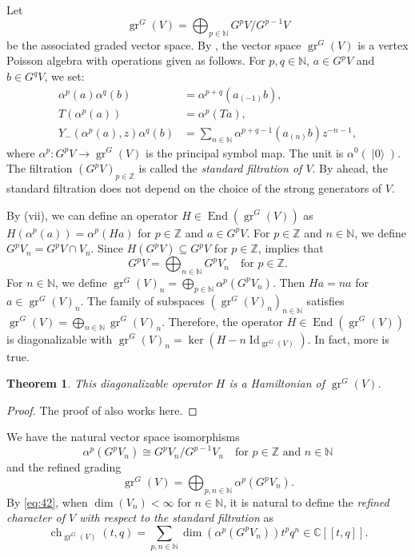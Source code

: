 \documentclass[a4paper, 12pt, reqno]{amsart}
\newtheorem{theorem}{Theorem}[section]
\theoremstyle{remark}
\DeclareMathOperator{\Id}{Id}
\DeclareMathOperator{\gr}{gr}
\DeclareMathOperator{\End}{End}
\DeclareMathOperator{\ch}{ch}
\DeclareMathOperator{\vac}{|0\rangle}
\begin{document}
Let
\begin{equation*}
  \gr^G(V) = \bigoplus_{p \in \mathbb{N}}G^pV/G^{p - 1}V
\end{equation*}
be the associated graded vector space.
By \cite{li_vertex_2004}, the vector space $\gr^G(V)$ is a vertex Poisson algebra with operations given as follows.
For $p, q \in \mathbb{N}$, $a \in G^pV$ and $b \in G^qV$, we set:
\begin{align*}
  \alpha^p(a)\alpha^q(b) &= \alpha^{p + q}(a_{(-1)}b), \\
  T(\alpha^p(a)) &= \alpha^p(Ta), \\
  Y_-(\alpha^p(a), z)\alpha^q(b) &= \sum_{n \in \mathbb{N}}\alpha^{p + q - 1}(a_{(n)}b)z^{-n - 1},
\end{align*}
where $\alpha^p: G^pV \to \gr^G(V)$ is the principal symbol map.
The unit is $\alpha^0(\vac)$.
The filtration $(G^pV)_{p \in \mathbb{Z}}$ is called the \emph{standard filtration of $V$}.
By  ahead, the standard filtration does not depend on the choice of the strong generators of $V$.

By (vii), we can define an operator $H \in \End(\gr^G(V))$ as $H(\alpha^p(a)) = \alpha^p(Ha)$ for $p \in \mathbb{Z}$ and $a \in G^pV$.
For $p \in \mathbb{Z}$ and $n \in \mathbb{N}$, we define $G^pV_n = G^pV \cap V_n$.
Since $H(G^pV) \subseteq G^pV$ for $p \in \mathbb{Z}$,  implies that
\begin{equation*}
  G^pV = \bigoplus_{n \in \mathbb{N}}G^pV_n \quad \text{for $p \in \mathbb{Z}$}.
\end{equation*}
For $n \in \mathbb{N}$, we define $\gr^G(V)_n = \bigoplus_{p \in \mathbb{N}}\alpha^p(G^pV_n)$.
Then $Ha = na$ for $a \in \gr^G(V)_n$.
The family of subspaces $(\gr^G(V)_n)_{n \in \mathbb{N}}$ satisfies $\gr^G(V) = \bigoplus_{n \in \mathbb{N}}\gr^G(V)_n$.
Therefore, the operator $H \in \End(\gr^G(V))$ is diagonalizable with $\gr^G(V)_n = \ker(H - n\Id_{\gr^G(V)})$.
In fact, more is true.

\begin{theorem}
  \label{thr:52}
  This diagonalizable operator $H$ is a Hamiltonian of $\gr^G(V)$.
\end{theorem}

\begin{proof}
  The proof of  also works here.
\end{proof}

We have the natural vector space isomorphisms
\begin{equation*}
  \alpha^p(G^pV_n) \cong G^pV_n/G^{p - 1}V_n \quad \text{for $p \in \mathbb{Z}$ and $n \in \mathbb{N}$}
\end{equation*}
and the refined grading
\begin{equation}
  \label{eq:42}
  \gr^G(V) = \bigoplus_{p, n \in \mathbb{N}}\alpha^p(G^pV_n).
\end{equation}
By \eqref{eq:42}, when $\dim(V_n) < \infty$ for $n \in \mathbb{N}$, it is natural to define the \emph{refined character of $V$ with respect to the standard filtration} as
\begin{equation*}
  \ch_{\gr^G(V)}(t, q) = \sum_{p, n \in \mathbb{N}}\dim(\alpha^p(G^pV_n))t^pq^n \in \mathbb{C}[[t, q]].
\end{equation*}
\end{document}
